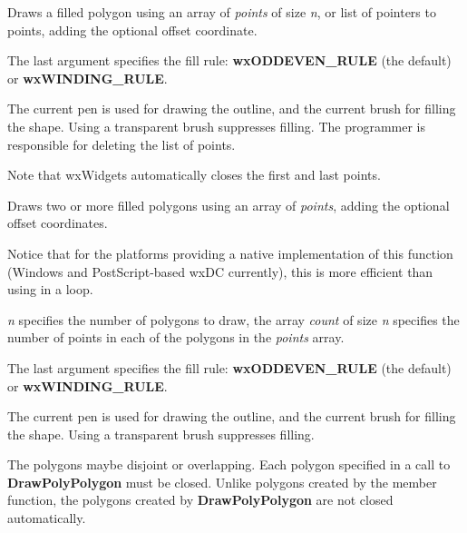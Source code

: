 Draws a filled polygon using an array of {\it points} of size {\it n},
or list of pointers to points, adding the optional offset coordinate.

The last argument specifies the fill rule: {\bf wxODDEVEN\_RULE} (the
default) or {\bf wxWINDING\_RULE}.

The current pen is used for drawing the outline, and the current brush
for filling the shape.  Using a transparent brush suppresses filling.
The programmer is responsible for deleting the list of points.

Note that wxWidgets automatically closes the first and last points.




\label{wxdcdrawpolypolygon}


Draws two or more filled polygons using an array of {\it points}, adding the
optional offset coordinates.

Notice that for the platforms providing a native implementation
of this function (Windows and PostScript-based wxDC currently), this is more
efficient than using  in a loop.

{\it n} specifies the number of polygons to draw, the array {\it count} of size 
{\it n} specifies the number of points in each of the polygons in the 
{\it points} array.

The last argument specifies the fill rule: {\bf wxODDEVEN\_RULE} (the default)
or {\bf wxWINDING\_RULE}.

The current pen is used for drawing the outline, and the current brush for
filling the shape.  Using a transparent brush suppresses filling.

The polygons maybe disjoint or overlapping. Each polygon specified in a call to
{\bf DrawPolyPolygon} must be closed. Unlike polygons created by the
 member function, the polygons created by
{\bf DrawPolyPolygon} are not closed automatically.

